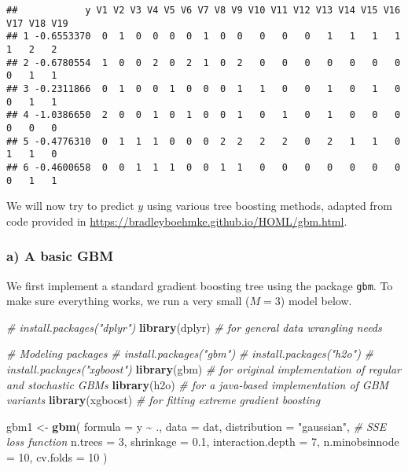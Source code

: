 \documentclass[
]{article}
\newenvironment{Shaded}{\begin{snugshade}}{\end{snugshade}}
\newcommand{\AttributeTok}[1]{\textcolor[rgb]{0.13,0.29,0.53}{#1}}
\newcommand{\CommentTok}[1]{\textcolor[rgb]{0.56,0.35,0.01}{\textit{#1}}}
\newcommand{\DecValTok}[1]{\textcolor[rgb]{0.00,0.00,0.81}{#1}}
\newcommand{\FloatTok}[1]{\textcolor[rgb]{0.00,0.00,0.81}{#1}}
\newcommand{\FunctionTok}[1]{\textcolor[rgb]{0.13,0.29,0.53}{\textbf{#1}}}
\newcommand{\NormalTok}[1]{#1}
\newcommand{\OtherTok}[1]{\textcolor[rgb]{0.56,0.35,0.01}{#1}}
\newcommand{\SpecialCharTok}[1]{\textcolor[rgb]{0.81,0.36,0.00}{\textbf{#1}}}
\newcommand{\StringTok}[1]{\textcolor[rgb]{0.31,0.60,0.02}{#1}}
\begin{document}
\begin{verbatim}
##            y V1 V2 V3 V4 V5 V6 V7 V8 V9 V10 V11 V12 V13 V14 V15 V16 V17 V18 V19
## 1 -0.6553370  0  1  0  0  0  0  1  0  0   0   0   0   1   1   1   1   1   2   2
## 2 -0.6780554  1  0  0  2  0  2  1  0  2   0   0   0   0   0   0   0   0   1   1
## 3 -0.2311866  0  1  0  0  1  0  0  0  1   1   0   0   1   0   1   0   0   1   1
## 4 -1.0386650  2  0  0  1  0  1  0  0  1   0   1   0   1   0   0   0   0   0   0
## 5 -0.4776310  0  1  1  1  0  0  0  2  2   2   2   0   2   1   1   0   1   1   0
## 6 -0.4600658  0  0  1  1  1  0  0  1  1   0   0   0   0   0   0   0   0   1   1
\end{verbatim}

We will now try to predict \(y\) using various tree boosting methods,
adapted from code provided in
\url{https://bradleyboehmke.github.io/HOML/gbm.html}.

\subsubsection{a) A basic GBM}\label{a-a-basic-gbm}

We first implement a standard gradient boosting tree using the package
\texttt{gbm}. To make sure everything works, we run a very small
(\(M=3\)) model below.

\begin{Shaded}
\begin{Highlighting}[]
\CommentTok{\# install.packages("dplyr")}
\FunctionTok{library}\NormalTok{(dplyr)    }\CommentTok{\# for general data wrangling needs}

\CommentTok{\# Modeling packages}
\CommentTok{\# install.packages("gbm")}
\CommentTok{\# install.packages("h2o")}
\CommentTok{\# install.packages("xgboost")}
\FunctionTok{library}\NormalTok{(gbm)      }\CommentTok{\# for original implementation of regular and stochastic GBMs}
\FunctionTok{library}\NormalTok{(h2o)      }\CommentTok{\# for a java{-}based implementation of GBM variants}
\FunctionTok{library}\NormalTok{(xgboost)  }\CommentTok{\# for fitting extreme gradient boosting}

\NormalTok{gbm1 }\OtherTok{\textless{}{-}} \FunctionTok{gbm}\NormalTok{(}
  \AttributeTok{formula =}\NormalTok{ y }\SpecialCharTok{\textasciitilde{}}\NormalTok{ .,}
  \AttributeTok{data =}\NormalTok{ dat,}
  \AttributeTok{distribution =} \StringTok{"gaussian"}\NormalTok{,  }\CommentTok{\# SSE loss function}
  \AttributeTok{n.trees =} \DecValTok{3}\NormalTok{,}
  \AttributeTok{shrinkage =} \FloatTok{0.1}\NormalTok{,}
  \AttributeTok{interaction.depth =} \DecValTok{7}\NormalTok{,}
  \AttributeTok{n.minobsinnode =} \DecValTok{10}\NormalTok{,}
  \AttributeTok{cv.folds =} \DecValTok{10}
\NormalTok{)}
\end{Highlighting}
\end{Shaded}
\end{document}
